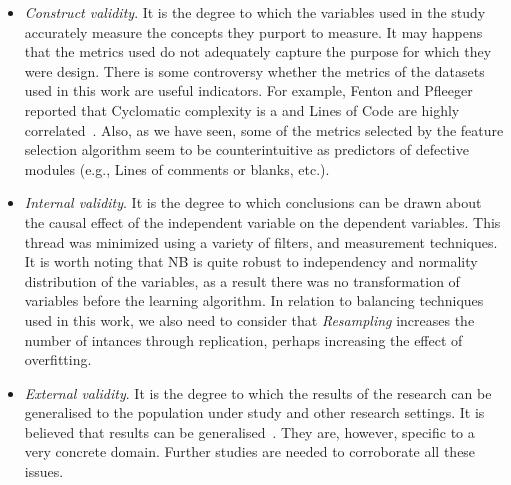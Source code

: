 \documentclass{elsart}
\begin{document}
\begin{itemize}
  \item \emph{Construct validity}. It is the degree to which the variables used in the study accurately measure the concepts they purport to measure. It may happens that the metrics used do not adequately capture the purpose for which they were design. There is some controversy whether the metrics of the datasets used in this work are useful indicators. For example, Fenton and Pfleeger reported that Cyclomatic complexity is a and Lines of Code are highly correlated~\cite{fenton97}. Also, as we have seen, some of the metrics selected by the feature selection algorithm seem to be counterintuitive as predictors of defective
modules (e.g., Lines of comments or blanks, etc.).

\item \emph{Internal validity}. It is the degree to which conclusions can be drawn about the causal effect of the independent variable on the dependent variables. This thread was minimized using a variety of filters, and measurement techniques. It is worth noting that NB is quite robust to independency and normality distribution of the variables, as a result there was no transformation of variables before the learning algorithm.
In relation to balancing techniques used in this work, we also need to consider that \emph{Resampling} increases the number of intances through replication, perhaps increasing the effect of overfitting.

\item \emph{External validity}. It is the degree to which the results of the research can be generalised to the population under study and other research settings. It is believed that results can be generalised~\cite{MenziesEtAl07,BasiliEtAl:2002}. They are, however, specific to a very concrete domain. Further studies are needed to corroborate all these issues.

\end{itemize}


\end{document}
